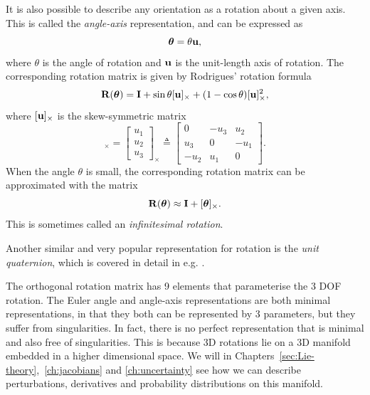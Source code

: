 It is also possible to describe any orientation as a rotation about a given axis.
This is called the \emph{angle-axis} representation, and can be expressed as
\begin{equation}
  {\boldsymbol{\mathbf{\theta}}} = \theta {\boldsymbol{\mathbf{u}}},
\end{equation}
where $\theta$ is the angle of rotation and ${\boldsymbol{\mathbf{u}}}$ is the unit-length axis of rotation.
The corresponding rotation matrix is given by Rodrigues' rotation formula
\begin{equation} \label{eq:rot-from-axis-angle}
  {\boldsymbol{\mathbf{R}}}({\boldsymbol{\mathbf{\theta}}}) = {\boldsymbol{\mathbf{I}}} + \sin \theta [{\boldsymbol{\mathbf{u}}}]_\times + (1 - \cos \theta) [{\boldsymbol{\mathbf{u}}}]^2_\times, 
\end{equation}
where $[{\boldsymbol{\mathbf{u}}}]_\times$ is the skew-symmetric matrix\footnotemark
\begin{equation}
  [\vecu]_\times =
  \begin{bmatrix}
    u_1\\
    u_2\\
    u_3
  \end{bmatrix}_\times \triangleq
  \begin{bmatrix}
    0 & -u_3 & u_2\\
    u_3 & 0 & -u_1\\
    -u_2 & u_1 & 0
  \end{bmatrix}.
\end{equation}
When the angle $\theta$ is small, the corresponding rotation matrix can be approximated with the matrix
\begin{equation} \label{eq:infinitesimal-rotaton}
  {\boldsymbol{\mathbf{R}}}({\boldsymbol{\mathbf{\theta}}}) \approx {\boldsymbol{\mathbf{I}}} + [{\boldsymbol{\mathbf{\theta}}}]_\times.
\end{equation}
This is sometimes called an \emph{infinitesimal rotation}.

Another similar and very popular representation for rotation is the \emph{unit quaternion}, which is covered in detail in e.g. \cite{barfoot2017state}.

The orthogonal rotation matrix has 9 elements that parameterise the 3 DOF rotation.
The Euler angle and angle-axis representations are both minimal representations, in that they both can be represented by 3 parameters, but they suffer from singularities.
In fact, there is no perfect representation that is minimal and also free of singularities.
This is because 3D rotations lie on a 3D manifold embedded in a higher dimensional space.
We will in Chapters~\ref{sec:Lie-theory},~\ref{ch:jacobians} and \ref{ch:uncertainty} see how we can describe perturbations, derivatives and probability distributions on this manifold.

